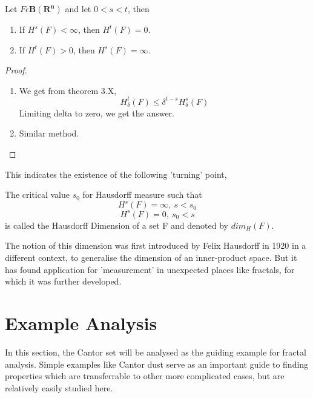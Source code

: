 \begin{theorem}
    Let $F \epsilon \bm{B(R^n)}$ and let $0 < s < t$, then
    \begin{enumerate}
        \item If $H^s(F) < \infty$, then $H^t(F) = 0$.
        \item If $H^t(F) > 0$, then $H^s(F) = \infty$.
    \end{enumerate}
\end{theorem}
\begin{proof}
    \begin{enumerate}
        \item We get from theorem 3.X,
            \[
                H^t_\delta(F) \leqslant \delta^{t-s}H^s_\delta(F)
            \]
            Limiting delta to zero, we get the answer.
        \item Similar method.
    \end{enumerate}
\end{proof}
This indicates the existence of the following 'turning' point,
\begin{definition}
    The critical value $s_0$ for Hausdorff measure such that
    \[
        H^s(F) = \infty, \: s<s_0
    \]
    \[
        H^s(F) = 0, \: s_0 < s
    \]
    is called the Hausdorff Dimension of a set F and denoted by $dim_H(F)$.
\end{definition}

The notion of this dimension was first introduced by Felix Hausdorff in 1920 in
a different context, to generalise the dimension of an inner-product space. But
it has found application for 'measurement' in unexpected places like fractals,
for which it was further developed.

\section{Example Analysis}
In this section, the Cantor set will be analysed as the guiding example for
fractal analysis.
Simple examples like Cantor dust serve as an important guide to finding
properties which are transferrable to other more complicated cases, but are
relatively easily studied here.

